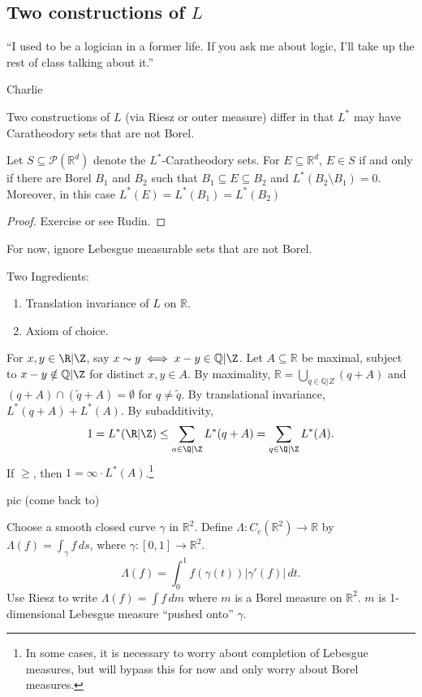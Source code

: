 \subsection{Two constructions of $L$}
\epigraph{``I used to be a logician in a former life. If you ask me about logic, I'll take up the rest of class talking about it.''}{Charlie}

Two constructions of $L$ (via Riesz or outer measure) differ in that $L^*$ may have Caratheodory sets that are not Borel.

\begin{theorem}
	Let $S \subseteq \mathcal{P}(\mathbb{R}^d)$ denote the $L^*$-Caratheodory sets. For $E \subseteq
	\mathbb{R}^d$, $E \in S$ if and only if there are Borel $B_1$ and $B_2$ such that 
	$B_1 \subseteq E \subseteq B_2$ and $L^*(B_2 \setminus B_1) = 0$. 
	Moreover, in this case  $L^*(E) = L^*(B_1) = L^*(B_2)$
\end{theorem}
\begin{proof}
	Exercise or see Rudin.
\end{proof}
For now, ignore Lebesgue measurable sets that are not Borel.

\begin{example}
	Two Ingredients:
	\begin{enumerate}
		\item Translation invariance of $L$ on $\mathbb{R}$.
		\item Axiom of choice.
	\end{enumerate}

	For $x, y \in \R | \Z$, say $x \sim y \iff x - y \in  \mathbb{Q} | \Z$.
	Let $A \subseteq \mathbb{R}$ be maximal, subject to $x - y \notin \mathbb{Q} | \Z$ for distinct $x,y \in A$.
	By maximality, $\mathbb{R} = \bigcup_{q \in \mathbb{Q} | Z} (q + A)$
	and $(q + A) \cap (\tilde{q} + A) = \emptyset$ for $q \neq \tilde{q}$.
	By translational invariance, $L^*(q + A) + L^*(A)$. By subadditivity, 
	\[
		1 = L^*(\R | \Z) \leq \sum_{a \in \Q | \Z} L^*(q + A) = \sum_{q \in \Q | \Z} L^*(A).
	\]
	If $\geq$, then $1 = \infty \cdot L^*(A)$.\footnote{In some cases, it is necessary to worry about completion of Lebesgue measures, but will bypass this for now and only worry about Borel measures.} 
\end{example}
pic (come back to)

\begin{definition}
	Choose a smooth closed curve $\gamma$ in $\mathbb{R}^2$. Define $\Lambda : C_c(\mathbb{R}^2) \to \mathbb{R}$ by $\Lambda (f) = \int_{\gamma} f \, ds$, where $\gamma :[0,1] \to \mathbb{R}^2$.
	\[
		\Lambda (f) = \int_{0}^{1} f(\gamma(t)) |\gamma'(f)| \, dt.
	\]
	Use Riesz to write $\Lambda (f) = \int f \, dm$ where $m$ is a Borel measure on $\mathbb{R}^2$.
	$m$ is 1-dimensional Lebesgue measure ``pushed onto'' $\gamma$.
\end{definition}

